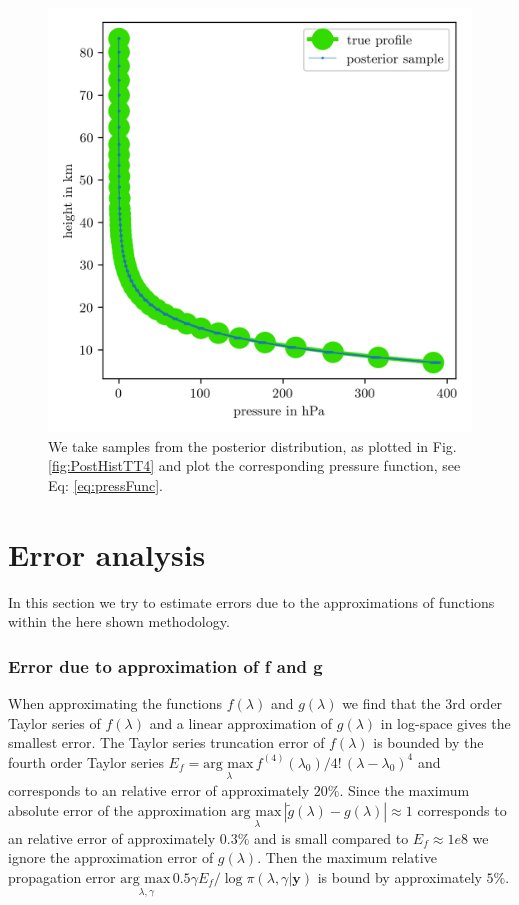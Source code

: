 \begin{figure}[ht!]
	\centering
	\includegraphics{PressPostMeanSigm.png}
	\caption[Pressure posterior samples.]{We take samples from the posterior distribution, as plotted in Fig. \ref{fig:PostHistTT4} and plot the corresponding pressure function, see Eq: \ref{eq:pressFunc}.}
	\label{fig:PressPost}
\end{figure}

\section{Error analysis}
In this section we try to estimate errors due to the approximations of functions within the here shown methodology.

\subsubsection{Error due to approximation of f and g}
\label{sec:fgErros}
When approximating the functions $f(\lambda)$ and $g(\lambda)$ we find that the 3rd order Taylor series of $f(\lambda)$ and a linear approximation of $g(\lambda)$ in log-space gives the smallest error.
The Taylor series truncation error of $f(\lambda)$ is bounded by the fourth order Taylor series $E_f = \underset{\lambda}{\text{arg max}\,} f^{(4)}(\lambda_0)/ 4! \, (\lambda - \lambda_{0} )^4$ and corresponds to an relative error of approximately $20\%$.
Since the maximum absolute error of the approximation $\underset{\lambda}{\text{arg max}\,}|\tilde{g}(\lambda) - g(\lambda) | \approx 1$ corresponds to an relative error of approximately $0.3\%$ and is small compared to $E_f \approx 1e8$ we ignore the approximation error of $g(\lambda)$.
Then the maximum relative propagation error $\underset{\lambda, \gamma}{\text{arg max}\,} 0.5 \gamma  E_f / \log{\pi{(\lambda ,\gamma | \bm{y})}} $ is bound by approximately $5\%$.

